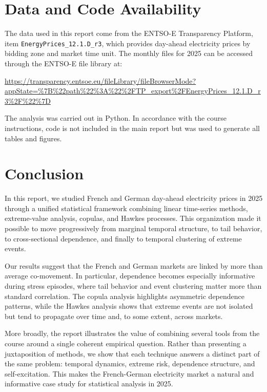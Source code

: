 \documentclass[11pt, a4paper]{article}
\theoremstyle{remark}
\begin{document}
\section*{Data and Code Availability}

The data used in this report come from the ENTSO-E Transparency Platform, item \texttt{EnergyPrices\_12.1.D\_r3}, which provides day-ahead electricity prices by bidding zone and market time unit. The monthly files for 2025 can be accessed through the ENTSO-E file library at:

\url{https://transparency.entsoe.eu/fileLibrary/fileBrowserMode?appState=\%7B\%22path\%22\%3A\%22\%2FTP_export\%2FEnergyPrices_12.1.D_r3\%2F\%22\%7D}

The analysis was carried out in Python. In accordance with the course instructions, code is not included in the main report but was used to generate all tables and figures.

\section{Conclusion}
\label{sec:conclusion}

In this report, we studied French and German day-ahead electricity prices in 2025 through a unified statistical framework combining linear time-series methods, extreme-value analysis, copulas, and Hawkes processes. This organization made it possible to move progressively from marginal temporal structure, to tail behavior, to cross-sectional dependence, and finally to temporal clustering of extreme events.

Our results suggest that the French and German markets are linked by more than average co-movement. In particular, dependence becomes especially informative during stress episodes, where tail behavior and event clustering matter more than standard correlation. The copula analysis highlights asymmetric dependence patterns, while the Hawkes analysis shows that extreme events are not isolated but tend to propagate over time and, to some extent, across markets.

More broadly, the report illustrates the value of combining several tools from the course around a single coherent empirical question. Rather than presenting a juxtaposition of methods, we show that each technique answers a distinct part of the same problem: temporal dynamics, extreme risk, dependence structure, and self-excitation. This makes the French-German electricity market a natural and informative case study for statistical analysis in 2025.
\end{document}
